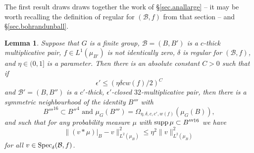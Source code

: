 \documentclass[12pt]{amsart}
\numberwithin{equation}{section}
\theoremstyle{plain}
\newtheorem{lemma}[subsection]{Lemma}
\theoremstyle{definition}
\renewcommand{\leq}{\leqslant}
\providecommand{\supp}{\mathop{\rm supp}\nolimits}
\providecommand{\Spec}{\mathop{\rm Spec}\nolimits}
\begin{document}
The first result draws draws together the work of \S\ref{sec.anallarge} -- it may be worth recalling the definition of regular for $(\mathcal{B},f)$ from that section -- and \S\ref{sec.bohrandunball}.
\begin{lemma}\label{lem.level}
Suppose that $G$ is a finite group, $\mathcal{B}=(B,B')$ is a $c$-thick multiplicative pair, $f \in L^1(\mu_{B'})$ is not identically zero, $\delta$ is regular for $(\mathcal{B},f)$, and $\eta\in (0,1]$ is a parameter. Then there is an absolute constant $C>0$ such that if 
\begin{equation*}
\epsilon' \leq (\eta\delta c w(f)/2)^{C}
\end{equation*}
and $\mathcal{B}'=(B,B'')$ is a $c'$-thick, $\epsilon'$-closed $32$-multiplicative pair, then there is a symmetric neighbourhood of the identity $B'''$ with
\begin{equation*}
B'''^{16} \subset B''^4 \textrm{ and } \mu_{G}(B''') = \Omega_{\eta,\delta,c,c',w(f)}(\mu_G(B)),
\end{equation*}
and such that for any probability measure $\mu$ with $\supp \mu \subset B'''^{16}$ we have
\begin{equation*}
\|(v \ast \mu)|_B -v\|_{L^2(\mu_B)}^2 \leq \eta^2\|v\|_{L^2(\mu_B)}^2
 \end{equation*}
 for all $v \in \Spec_\delta(\mathcal{B},f)$.
\end{lemma}
\end{document}
